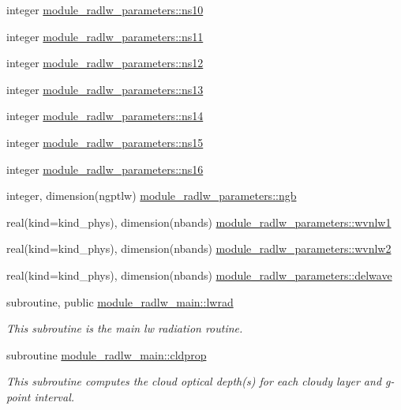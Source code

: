 \begin{DoxyCompactItemize}
integer \hyperlink{group__module__radlw__main_ga66d1bbe720448a035ccf689d77418cd5}{module\+\_\+radlw\+\_\+parameters\+::ns10}
\item 
integer \hyperlink{group__module__radlw__main_gace01958b71c7f6923fd9b3ba39b3b668}{module\+\_\+radlw\+\_\+parameters\+::ns11}
\item 
integer \hyperlink{group__module__radlw__main_gaabdc77471aadc2932eb213f3b7ecb66c}{module\+\_\+radlw\+\_\+parameters\+::ns12}
\item 
integer \hyperlink{group__module__radlw__main_ga239c74495526cdf72b28e1f5c1d0318e}{module\+\_\+radlw\+\_\+parameters\+::ns13}
\item 
integer \hyperlink{group__module__radlw__main_ga1d49c23da2ed69069a97f861a28a531e}{module\+\_\+radlw\+\_\+parameters\+::ns14}
\item 
integer \hyperlink{group__module__radlw__main_ga9662e6bd344b1dbbfa7cc4429753bb10}{module\+\_\+radlw\+\_\+parameters\+::ns15}
\item 
integer \hyperlink{group__module__radlw__main_ga3a7ba0b8f35271e7979deea86f834479}{module\+\_\+radlw\+\_\+parameters\+::ns16}
\item 
integer, dimension(ngptlw) \hyperlink{group__module__radlw__main_ga2c571bd14c9b7982a7968976858c7547}{module\+\_\+radlw\+\_\+parameters\+::ngb}
\item 
real(kind=kind\+\_\+phys), dimension(nbands) \hyperlink{group__module__radlw__main_ga3a7370a94889d0cbaf6057404830d978}{module\+\_\+radlw\+\_\+parameters\+::wvnlw1}
\item 
real(kind=kind\+\_\+phys), dimension(nbands) \hyperlink{group__module__radlw__main_gace30abd03d144096ee6b444b46081b58}{module\+\_\+radlw\+\_\+parameters\+::wvnlw2}
\item 
real(kind=kind\+\_\+phys), dimension(nbands) \hyperlink{group__module__radlw__main_ga6ad1dff8ffc039d03c5cf3059344308e}{module\+\_\+radlw\+\_\+parameters\+::delwave}
\end{DoxyCompactItemize}
\begin{DoxyCompactItemize}
\item 
subroutine, public \hyperlink{group__module__radlw__main_gacff9ff756859e9abcd3905c7725fdff3}{module\+\_\+radlw\+\_\+main\+::lwrad}
\begin{DoxyCompactList}\small\item\em This subroutine is the main lw radiation routine. \end{DoxyCompactList}\end{DoxyCompactItemize}
\begin{DoxyCompactItemize}
\item 
subroutine \hyperlink{group__module__radlw__main_ga735598d1b11b0a090d142977a8f64f89}{module\+\_\+radlw\+\_\+main\+::cldprop}
\begin{DoxyCompactList}\small\item\em This subroutine computes the cloud optical depth(s) for each cloudy layer and g-\/point interval. \end{DoxyCompactList}\end{DoxyCompactItemize}
